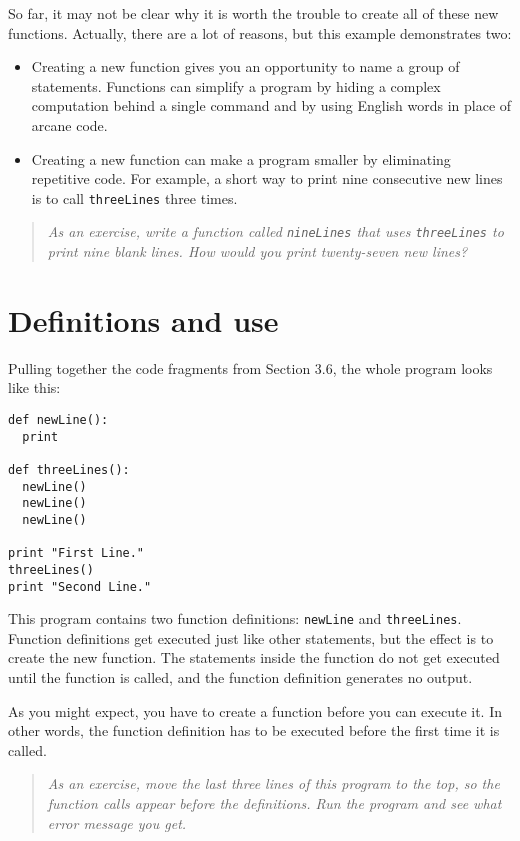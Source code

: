 So far, it may not be clear why it is worth the trouble to create all of these
new functions.  Actually, there are a lot of reasons, but this example
demonstrates two:

\begin{itemize}

\item Creating a new function gives you an opportunity to name a
group of statements.  Functions can simplify a program by hiding a complex
computation behind a single command and by using English words in place of
arcane code.

\item Creating a new function can make a program smaller by eliminating
repetitive code.  For example, a short way to print nine consecutive new
lines is to call {\tt threeLines} three times.

\end{itemize}

\begin{quote}
{\em As an exercise, write a function called {\tt nineLines} that uses
{\tt threeLines} to print nine blank lines. How would you print 
twenty-seven new lines?}
\end{quote}


\section{Definitions and use}

Pulling together the code fragments from Section 3.6, the
whole program looks like this:

\beforeverb
\begin{verbatim}
def newLine():
  print

def threeLines():
  newLine()
  newLine()
  newLine()

print "First Line."
threeLines()
print "Second Line."
\end{verbatim}
\afterverb
%
This program contains two function definitions: {\tt newLine} and
{\tt threeLines}.  Function definitions get executed just like other
statements, but the effect is to create the new function.  The statements
inside the function do not get executed until the function is called, and
the function definition generates no output.

As you might expect, you have to create a function before you can
execute it.  In other words, the function definition has to be
executed before the first time it is called.

\begin{quote}
{\em As an exercise, move the last three lines of this program
to the top, so the function calls appear before the definitions. Run 
the program and see what error
message you get.}
\end{quote}

